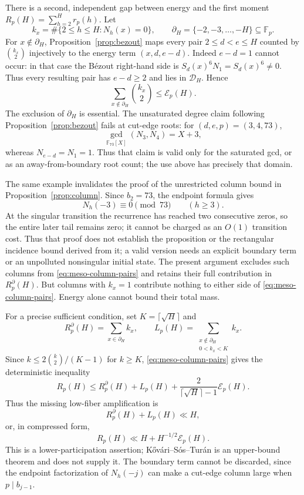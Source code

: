 There is a second, independent gap between energy and the first moment
$R_p(H)=\sum_{h=2}^H r_p(h)$.  Let
\[
 k_x=\#\{2\leq h\leq H:N_h(x)=0\},\qquad
 \partial_H=\{-2,-3,\ldots,-H\}\subseteq\mathbb F_p.
\]
For $x\notin\partial_H$, Proposition~\ref{prop:bezout} maps every pair
$2\leq d<e\leq H$ counted by $\binom{k_x}{2}$ injectively to the energy
term $(x,d,e-d)$.  Indeed $e-d=1$ cannot occur: in that case the B\'ezout
right-hand side is $S_d(x)^6N_1=S_d(x)^6\ne0$.  Thus every resulting
pair has $e-d\geq2$ and lies in $\mathscr D_H$.  Hence
\begin{equation}\label{eq:meso-column-pairs}
 \sum_{x\notin\partial_H}\binom{k_x}{2}\leq\mathcal E_p(H).
\end{equation}
The exclusion of $\partial_H$ is essential.  The unsaturated degree claim
following Proposition~\ref{prop:bezout} fails at cut-edge roots: for
$(d,e,p)=(3,4,73)$,
\[
 \gcd_{\mathbb F_{73}[X]}(N_3,N_4)=X+3,
\]
whereas $N_{e-d}=N_1=1$.  Thus that claim is valid only for the saturated
gcd, or as an away-from-boundary root count; the use above has precisely
that domain.

The same example invalidates the proof of the unrestricted column bound in
Proposition~\ref{prop:column}.  Since $b_2=73$, the endpoint formula gives
\[
 N_h(-3)\equiv0\pmod {73}\qquad(h\geq3).
\]
At the singular transition the recurrence has reached two consecutive
zeros, so the entire later tail remains zero; it cannot be charged as an
$O(1)$ transition cost.  Thus that proof does not establish the proposition
or the rectangular incidence bound derived from it; a valid version needs
an explicit boundary term or an unpolluted nonsingular initial state.  The
present argument excludes such columns from
\eqref{eq:meso-column-pairs} and retains their full contribution in
$R_p^\partial(H)$.
But columns with $k_x=1$ contribute nothing to either side of
\eqref{eq:meso-column-pairs}.  Energy alone cannot bound their total mass.

For a precise sufficient condition, set $K=\lceil\sqrt H\rceil$ and
\[
 R_p^\partial(H)=\sum_{x\in\partial_H}k_x,
 \qquad
 L_p(H)=\sum_{\substack{x\notin\partial_H\\0<k_x<K}}k_x.
\]
Since $k\leq2\binom{k}{2}/(K-1)$ for $k\geq K$,
\eqref{eq:meso-column-pairs} gives the deterministic inequality
\begin{equation}\label{eq:meso-amplification-exact}
 \boxed{
 R_p(H)\leq R_p^\partial(H)+L_p(H)
 +\frac{2}{\lceil\sqrt H\rceil-1}\mathcal E_p(H).}
\end{equation}
Thus the missing low-fiber amplification is
\begin{equation}\label{eq:meso-missing-amplification}
 R_p^\partial(H)+L_p(H)\ll H,
\end{equation}
or, in compressed form,
\[
 R_p(H)\ll H+H^{-1/2}\mathcal E_p(H).
\]
This is a lower-participation assertion; K\H{o}v\'ari--S\'os--Tur\'an is
an upper-bound theorem and does not supply it.  The boundary term cannot
be discarded, since the endpoint factorization of $N_h(-j)$ can make a
cut-edge column large when $p\mid b_{j-1}$.

